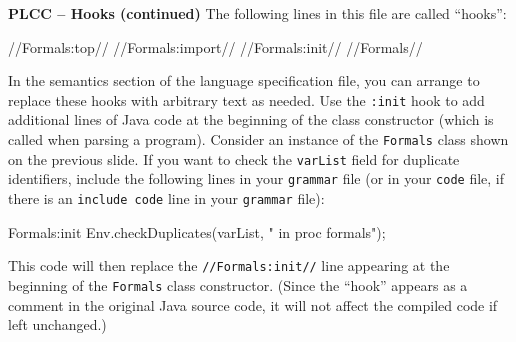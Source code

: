 \begin{minipage}[t]{\sw}
\slidenumber
\LARGE
{\bf PLCC -- Hooks (continued)}\exx
The following lines in this file are called ``hooks'':
{\Large
\begin{qv}
//Formals:top//
//Formals:import//
//Formals:init//
//Formals//
\end{qv}
}
In the semantics section of the language specification file,
you can arrange to replace these hooks with arbitrary text as needed.\exx
Use the \verb':init' hook
to add additional lines of Java code
at the beginning of the class constructor
(which is called when parsing a program).
Consider an instance of the \verb'Formals' class shown on the previous slide.
If you want to check the \verb'varList' field for duplicate identifiers,
include the following lines in your \verb'grammar' file
(or in your \verb'code' file,
if there is an \verb'include code' line
in your \verb'grammar' file):
{\Large
\begin{qv}
Formals:init
    Env.checkDuplicates(varList, " in proc formals");
\end{qv}
}
This code will then replace the {\Large \verb'//Formals:init//'} line
appearing at the beginning of the \verb'Formals' class constructor.
(Since the ``hook'' appears as a comment in the original Java source code,
it will not affect the compiled code if left unchanged.)
\end{minipage}
\clearpage
